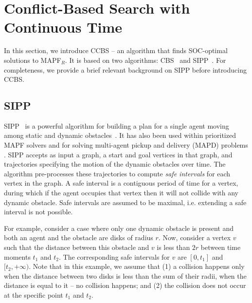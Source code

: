 \documentclass[review]{elsarticle}
\newcommand\konstantin[1]{\nb{\textbf{Konstantin:}}{red}{#1}}
\newcommand\roni[1]{\nb{\textbf{Roni:}}{green}{#1}}
\newcommand{\ccbs}{\ac{CCBS}\xspace}
\newcommand{\cbs}{\ac{CBS}\xspace}
\newcommand{\sipp}{\ac{SIPP}\xspace}
\newcommand{\mapfr}{\ac{MAPF}$_R$\xspace}
\newcommand{\mapf}{\ac{MAPF}\xspace}
\begin{document}


\section{Conflict-Based Search with Continuous Time}
\label{sec:ccbs}
In this section, we introduce \ccbs{} -- an algorithm that finds SOC-optimal solutions to  \mapfr. 
It is based on two algorithms: \cbs~\cite{sharon2015conflict} and \sipp~\cite{phillips2011sipp}. 
For completeness, we provide a brief relevant background on \sipp before introducing \ccbs. 


\subsection{\sipp}
\sipp~\cite{phillips2011sipp} is a powerful algorithm for building a plan for a single agent moving among static and dynamic obstacles~\cite{phillips2011sipp}. 
It has also been used within prioritized \mapf solvers \cite{yakovlev2017anyAngle} and for solving multi-agent pickup and delivery (MAPD) problems \cite{ma2019lifelong}. 
\sipp accepts as input a graph, a start and goal vertices in that graph, and trajectories specifying the motion of the dynamic obstacles over time. 
The algorithm pre-processes these trajectories to compute \emph{safe intervals} for each vertex in the graph. 
A safe interval is a contiguous period of time for a vertex, during which if the agent occupies that vertex then it will not collide with any dynamic obstacle. 
Safe intervals are assumed to be maximal, i.e. extending a safe interval is not possible.

For example, consider a case where only one dynamic obstacle is present and both an agent and the obstacle are disks of radius $r$.
Now, consider a vertex $v$ such that the distance between this obstacle and $v$ is less than $2r$ between time moments $t_1$ and $t_2$. The corresponding safe intervals for $v$ are $[0, t_1]$ and $[t_2, +\infty)$.
Note that in this example, we assume that (1) a collision happens only when the distance between two disks is less than the sum of their radii, when the distance is equal to it -- no collision happens; and (2) the collision does not occur at the specific point $t_1$ and $t_2$.
\end{document}
